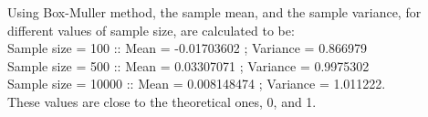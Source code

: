 \documentclass[11pt]{article}
\begin{document}
Using Box-Muller method, the sample mean, and the sample variance, for different values of sample size, are calculated to be:\\
Sample size = 100	\hspace{10mm}::\hspace{10mm}	Mean = -0.01703602	\hspace{8mm};\hspace{10mm}	Variance = 0.866979\\
Sample size = 500	\hspace{10mm}::\hspace{10mm}	Mean = 0.03307071	\hspace{10mm};\hspace{10mm}	Variance = 0.9975302\\
Sample size = 10000	\hspace{6mm}::\hspace{10mm}		Mean = 0.008148474	\hspace{8mm};\hspace{10mm}	Variance = 1.011222.\\
These values are close to the theoretical ones, 0, and 1.\\
\end{document}
